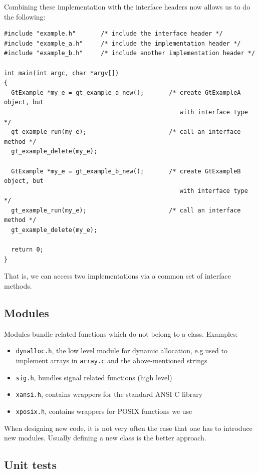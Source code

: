 \documentclass[11pt,final]{article}
\newcommand{\keyword}[1]{\lstinline{#1}}
\begin{document}
Combining these implementation with the interface headers now allows us to do
the following:

\begin{lstlisting}
#include "example.h"       /* include the interface header */
#include "example_a.h"     /* include the implementation header */
#include "example_b.h"     /* include another implementation header */

int main(int argc, char *argv[])
{
  GtExample *my_e = gt_example_a_new();       /* create GtExampleA object, but
                                                 with interface type */
  gt_example_run(my_e);                       /* call an interface method */
  gt_example_delete(my_e);

  GtExample *my_e = gt_example_b_new();       /* create GtExampleB object, but
                                                 with interface type */
  gt_example_run(my_e);                       /* call an interface method */
  gt_example_delete(my_e);

  return 0;
}
\end{lstlisting}

That is, we can access two implementations via a common set of interface
methods.

\subsection{Modules}

Modules bundle related functions which do not belong to a class. Examples:
\begin{itemize}
\item
\keyword{dynalloc.h}, the low level module for dynamic allocation,
e.g.\@ used to implement arrays in \keyword{array.c} and the
above-mentioned strings
\item
\keyword{sig.h}, bundles signal related functions (high level)
\item
\keyword{xansi.h}, contains wrappers for the standard ANSI C library
\item
\keyword{xposix.h}, contains wrappers for POSIX functions we use
\end{itemize}

When designing new code, it is not very often the case that one has to introduce
new modules. Usually defining a new class is the better approach.

\subsection{Unit tests}
\end{document}
